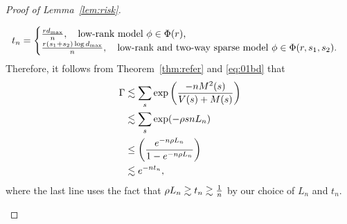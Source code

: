 \documentclass[11pt]{article}
\theoremstyle{plain}
\theoremstyle{definition}
\begin{document}
\begin{proof}[Proof of Lemma~\ref{lem:risk}]
\begin{enumerate}[label={2.\arabic*},wide, labelwidth=!, labelindent=0pt]
\[
t_n=\begin{cases}
{rd_{\max}\over n}, \quad \text{low-rank model $\phi\in\Phi(r)$,}\\
{r(s_1+s_2)\log d_{\max}\over n}, \quad \text{low-rank and two-way sparse model $\phi\in\Phi(r,s_1,s_2)$.}\\
\end{cases}
\]
Therefore, it follows from Theorem~\ref{thm:refer} and \eqref{eq:01bd} that 
\begin{align}
\Gamma&\lesssim  \sum_{s} \exp\left(-nM^2(s)\over V(s)+M(s)\right)\\&\lesssim \sum_{s}\exp(-\rho snL_n)\\&\leq \left(e^{-n\rho L_n}\over 1-e^{-n\rho L_n}\right)\\&\lesssim e^{-nt_n},
\end{align}
where the last line uses the fact that $\rho L_n\gtrsim t_n \gtrsim{1\over n}$ by our choice of $L_n$ and $t_n$.
\end{enumerate}
\end{proof}
\end{document}
